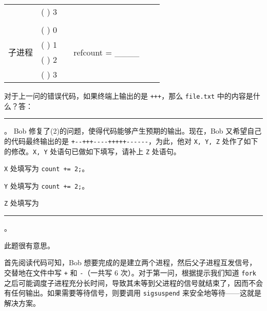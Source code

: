\begin{problems}
\begin{table}[H]
\begin{tabular}{cccccc}
                \multicolumn{1}{|c|}{} & \multicolumn{1}{c|}{(     ) 3} & \multicolumn{1}{c|}{} & \multicolumn{1}{c|}{} & \multicolumn{1}{c|}{} & \multicolumn{1}{c|}{} \\ \cline{1-2} \cline{4-4}
                &  &  &  & \multicolumn{1}{c|}{} & \multicolumn{1}{c|}{} \\ \cline{1-2} \cline{4-4}
                \multicolumn{1}{|c|}{\multirow{4}{*}{子进程}} & \multicolumn{1}{c|}{(     ) 0} & \multicolumn{1}{c|}{} & \multicolumn{1}{c|}{\multirow{4}{*}{refcount = \_\_\_\_}} & \multicolumn{1}{c|}{} & \multicolumn{1}{c|}{} \\ \cline{2-2}
                \multicolumn{1}{|c|}{} & \multicolumn{1}{c|}{(     ) 1} & \multicolumn{1}{c|}{} & \multicolumn{1}{c|}{} & \multicolumn{1}{c|}{} & \multicolumn{1}{c|}{} \\ \cline{2-2}
                \multicolumn{1}{|c|}{} & \multicolumn{1}{c|}{(     ) 2} & \multicolumn{1}{c|}{} & \multicolumn{1}{c|}{} & \multicolumn{1}{c|}{} & \multicolumn{1}{c|}{} \\ \cline{2-2}
                \multicolumn{1}{|c|}{} & \multicolumn{1}{c|}{(     ) 3} & \multicolumn{1}{c|}{} & \multicolumn{1}{c|}{} & \multicolumn{1}{c|}{} & \multicolumn{1}{c|}{} \\ \cline{1-2} \cline{4-4} \cline{6-6} 
            \end{tabular}
        \end{table}
        \qn 对于上一问的错误代码，如果终端上输出的是 \verb|+++|，那么 \verb|file.txt| 中的内容是什么？答：\rule{6cm}{0.25mm}。
        \qn Bob 修复了(2)的问题，使得代码能够产生预期的输出。现在，Bob 又希望自己的代码最终输出的是 \verb|+--+++----+++++------|，为此，他对 \verb|X, Y, Z| 处作了如下的修改。\verb|X, Y| 处语句已做如下填写，请补上 \verb|Z| 处语句。
        \begin{compactitem}
            \item \verb|X| 处填写为 \verb|count += 2;|。
            \item \verb|Y| 处填写为 \verb|count += 2;|。
            \item \verb|Z| 处填写为 \rule{6cm}{0.25mm}。
        \end{compactitem}
        \sol 此题很有意思。

        首先阅读代码可知，Bob 想要完成的是建立两个进程，然后父子进程互发信号，交替地在文件中写 \verb|+| 和 \verb|-|（一共写 6 次）。对于第一问，根据提示我们知道 \verb|fork| 之后可能调度子进程充分长时间，导致其未等到父进程的信号就结束了，因而不会有任何输出。如果需要等待信号，则要调用 \verb|sigsuspend| 来安全地等待——这就是解决方案。


\end{problems}
